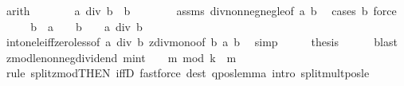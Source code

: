 \begin{isabellebody}
\ arith\isanewline
\ \ \isamarkupfalse%
\ \isamarkupfalse%
\ {\isachardoublequoteopen}{}\ {\isacharless}{\kern0pt}\ a\ div\ b\ {\isasymLongrightarrow}\ b\ {\isachargreater}{\kern0pt}\ {}{\isachardoublequoteclose}\isanewline
\ \ \ \ \isamarkupfalse%
\ assms\ div{\isacharunderscore}{\kern0pt}nonneg{\isacharunderscore}{\kern0pt}neg{\isacharunderscore}{\kern0pt}le{}{\isacharbrackleft}{\kern0pt}of\ a\ b{\isacharbrackright}{\kern0pt}\ \ \isamarkupfalse%
{\isacharparenleft}{\kern0pt}cases\ {\isachardoublequoteopen}b{\isacharequal}{\kern0pt}{}{\isachardoublequoteclose}{\isacharsemicolon}{\kern0pt}\ force{\isacharparenright}{\kern0pt}\isanewline
\ \ \isamarkupfalse%
\ \isamarkupfalse%
\ {\isachardoublequoteopen}b\ {\isasymle}\ a\ {\isasymand}\ {}\ {\isacharless}{\kern0pt}\ b\ {\isasymLongrightarrow}\ {}\ {\isacharless}{\kern0pt}\ a\ div\ b{\isachardoublequoteclose}\isanewline
\ \ \ \ \isamarkupfalse%
\ int{\isacharunderscore}{\kern0pt}one{\isacharunderscore}{\kern0pt}le{\isacharunderscore}{\kern0pt}iff{\isacharunderscore}{\kern0pt}zero{\isacharunderscore}{\kern0pt}less{\isacharbrackleft}{\kern0pt}of\ {\isachardoublequoteopen}a\ div\ b{\isachardoublequoteclose}{\isacharbrackright}{\kern0pt}\ zdiv{\isacharunderscore}{\kern0pt}mono{}{\isacharbrackleft}{\kern0pt}of\ b\ a\ b{\isacharbrackright}{\kern0pt}\ \isamarkupfalse%
\ simp\isanewline
\ \ \isamarkupfalse%
\ \isamarkupfalse%
\ {\isacharquery}{\kern0pt}thesis\isanewline
\ \ \ \ \isamarkupfalse%
\ blast\isanewline
{}\isamarkupfalse%
%
\endisatagproof
{\isafoldproof}%
%
\isadelimproof
\isanewline
%
\endisadelimproof
\isanewline
{}\isamarkupfalse%
\ zmod{\isacharunderscore}{\kern0pt}le{\isacharunderscore}{\kern0pt}nonneg{\isacharunderscore}{\kern0pt}dividend{\isacharcolon}{\kern0pt}\ {\isachardoublequoteopen}{\isacharparenleft}{\kern0pt}m{\isacharcolon}{\kern0pt}{\isacharcolon}{\kern0pt}int{\isacharparenright}{\kern0pt}\ {\isasymge}\ {}\ {\isasymLongrightarrow}\ m\ mod\ k\ {\isasymle}\ m{\isachardoublequoteclose}\isanewline
%
\isadelimproof
\ \ %
\endisadelimproof
%
\isatagproof
{}\isamarkupfalse%
\ {\isacharparenleft}{\kern0pt}rule\ split{\isacharunderscore}{\kern0pt}zmod{\isacharbrackleft}{\kern0pt}THEN\ iffD{}{\isacharbrackright}{\kern0pt}{\isacharparenright}{\kern0pt}\ {\isacharparenleft}{\kern0pt}fastforce\ dest{\isacharcolon}{\kern0pt}\ q{\isacharunderscore}{\kern0pt}pos{\isacharunderscore}{\kern0pt}lemma\ intro{\isacharcolon}{\kern0pt}\ split{\isacharunderscore}{\kern0pt}mult{\isacharunderscore}{\kern0pt}pos{\isacharunderscore}{\kern0pt}le{\isacharparenright}{\kern0pt}%

\end{isabellebody}
